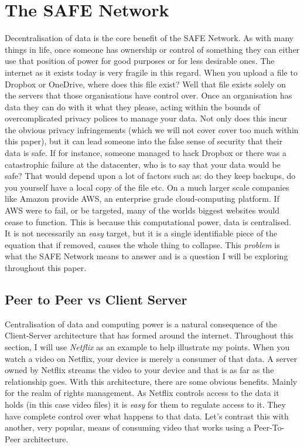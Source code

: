 \documentclass{l4proj}
\begin{document}
\chapter{The SAFE Network}

Decentralisation of data is the core benefit of the SAFE Network. As with many things in life, once someone has ownership or control of something they can either use that position of power for good purposes or for less desirable ones. The internet as it exists today is very fragile in this regard. When you upload a file to Dropbox or OneDrive, where does this file exist? Well that file exists solely on the servers that those organisations have control over. Once an organisation has data they can do with it what they please, acting within the bounds of overcomplicated privacy polices to manage your data. Not only does this incur the obvious privacy infringements (which we will not cover cover too much within this paper), but it can lead someone into the false sense of security that their data is safe. If for instance, someone managed to hack Dropbox or there was a catastrophic failure at the datacenter, who is to say that your data would be safe? That would depend upon a lot of factors such as: do they keep backups, do you yourself have a local copy of the file etc. On a much larger scale companies like Amazon provide AWS, an enterprise grade cloud-computing platform. If AWS were to fail, or be targeted, many of the worlds biggest websites would cease to function. This is because this computational power, data is centralised. It is not necessarily an \textit{easy} target, but it is a single identifiable piece of the equation that if removed, causes the whole thing to collapse. This \textit{problem} is what the SAFE Network means to answer and is a question I will be exploring throughout this paper.

\section{Peer to Peer vs Client Server}

Centralisation of data and computing power is a natural consequence of the Client-Server architecture that has formed around the internet. Throughout this section, I will use \textit{Netflix} as an example to help illustrate my points. When you watch a video on Netflix, your device is merely a consumer of that data. A server owned by Netflix streams the video to your device and that is as far as the relationship goes. With this architecture, there are some obvious benefits. Mainly for the realm of rights management. As Netflix controls access to the data it holds (in this case video files) it is \textit{easy} for them to regulate access to it. They have complete control over what happens to that data. Let's contrast this with another, very popular, means of consuming video that works using a Peer-To-Peer architecture.
\end{document}
